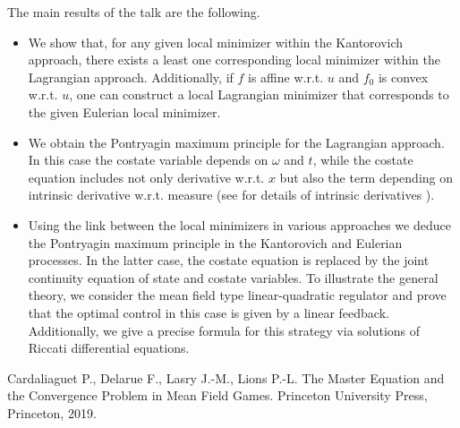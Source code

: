 \documentclass[12pt]{llncs}
\begin{document}
The main results of the talk are the following.
\begin{itemize}
	\item We show that, for any given  local minimizer within the Kantorovich approach, there exists a least one corresponding local minimizer within the Lagrangian approach. Additionally, if $f$ is affine w.r.t. $u$ and $f_0$ is convex w.r.t. $u$, one can construct a local Lagrangian minimizer that corresponds to the given Eulerian local minimizer.
	\item We obtain the Pontryagin maximum principle for the Lagrangian approach. In this case the costate variable depends on $\omega$ and $t$, while the costate equation includes not only derivative w.r.t. $x$ but also the term depending on intrinsic derivative w.r.t. measure (see for details of intrinsic  derivatives \cite{Lions}).
	\item Using the link between the local minimizers in various approaches we deduce the Pontryagin maximum principle in the Kantorovich and Eulerian processes. In the latter case, the costate equation is replaced by the joint continuity equation of state and costate variables. To illustrate the general theory, we consider the mean field type linear-quadratic regulator and prove that the optimal control in this case is given by a linear feedback. Additionally,  we give a precise formula for this strategy via solutions of Riccati differential equations.
\end{itemize}

\begin{thebibliography}{9} %
	  Cardaliaguet P.,  Delarue F.,  Lasry J.-M.,  Lions P.-L. The Master Equation and the Convergence Problem in Mean Field Games. Princeton University Press, Princeton, 2019.
\end{thebibliography}


\end{document}

